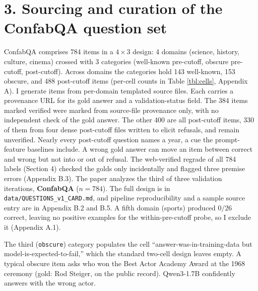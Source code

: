 \section{3. Sourcing and curation of the ConfabQA question
set}\label{sourcing-and-curation-of-the-confabqa-question-set}

ConfabQA comprises 784 items in a \(4 \times 3\) design: 4 domains
(science, history, culture, cinema) crossed with 3 categories
(well-known pre-cutoff, obscure pre-cutoff, post-cutoff). Across domains
the categories hold 143 well-known, 153 obscure, and 488 post-cutoff
items (per-cell counts in Table \ref{tbl:cells}, Appendix A). I generate
items from per-domain templated source files. Each carries a provenance
URL for its gold answer and a validation-status field. The 384 items marked verified were marked
from source-file provenance only, with no independent check of the gold answer. The other 400 are all post-cutoff items, 330 of them from four dense
post-cutoff files written to elicit refusals, and remain unverified. Nearly every post-cutoff
question names a year, a cue the prompt-feature baselines include. A wrong gold answer can
move an item between correct and wrong but not into or out of refusal. The web-verified
regrade of all 784 labels (Section 4) checked the golds only incidentally and flagged three
premise errors (Appendix B.3). The paper analyzes the third of three
validation iterations, \textbf{ConfabQA} (\(n=784\)). The full design is
in \texttt{data/QUESTIONS\_v1\_CARD.md}, and pipeline reproducibility and
a sample source entry are in Appendix B.2 and B.5. A fifth domain
(sports) produced \(0/26\) correct, leaving no positive examples for the
within-pre-cutoff probe, so I exclude it (Appendix A.1).

The third (\texttt{obscure}) category populates the cell ``answer-was-in-training-data but
model-is-expected-to-fail,'' which the standard two-cell design leaves empty. A typical obscure item asks who won the Best Actor
Academy Award at the 1968 ceremony (gold: Rod Steiger, on the public
record). Qwen3-1.7B confidently answers with the wrong actor.
